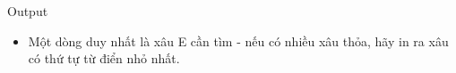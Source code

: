 Output  
\begin{itemize}
	\item     Một dòng duy nhất là xâu E cần tìm - nếu có nhiều xâu thỏa, hãy in ra xâu có thứ tự từ điển nhỏ nhất.   
\end{itemize}